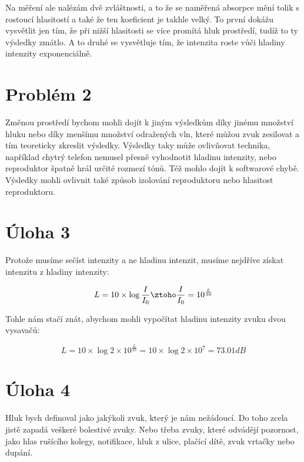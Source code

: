 \documentclass{fkssolpub}
\begin{document}
Na měření ale nalézám dvě zvláštnosti, a to že se naměřená absorpce mění
tolik s rostoucí hlasitostí a také že ten koeficient je takhle velký.
To první dokážu vysvětlit jen tím, že při nižší hlasitosti se více promítá
hluk prostředí, tudíž to ty výsledky zmátlo. A to druhé se vysvětluje tím,
že intenzita roste vůči hladiny intenzity exponenciálně.

\section{Problém 2}

Změnou prostředí bychom mohli dojít k jiným výsledkům díky jinému množství
hluku nebo díky menšímu množství odražených vln, které můžou zvuk zesilovat
a tím teoreticky zkreslit výsledky. Výsledky taky může ovlivňovat technika,
například chytrý telefon nemusel přesně vyhodnotit hladinu intenzity, nebo
reproduktor špatně hrál určité rozmezí tónů. Též mohlo dojít k softwarové
chybě. Výsledky mohli ovlivnit také způsob izolování reproduktoru nebo
hlasitost reproduktoru.

\section{Úloha 3}

Protože musíme sečíst intenzity a ne hladinu intenzit, musíme nejdříve získat
intenzitu z hladiny intenzity:

\[
  L = 10 \times \log{\frac{I}{I_0}} \ztoho \frac{I}{I_0} = 10^{\frac{L}{10}}
\]

Tohle nám stačí znát, abychom mohli vypočítat hladinu intenzity zvuku dvou vysavačů:

\[
  L = 10 \times \log{2 \times 10^{\frac{L}{10}}} = 10 \times \log{2 \times 10^7}
    = 73.01 dB
\]

\section{Úloha 4}

Hluk bych definoval jako jakýkoli zvuk, který je nám nežádoucí. Do toho zcela jistě
zapadá veškeré bolestivé zvuky. Nebo třeba zvuky, které odvádějí pozornost, jako
hlas rušícího kolegy, notifikace, hluk z ulice, plačící dítě, zvuk vrtačky nebo
dupání. 
\end{document}
